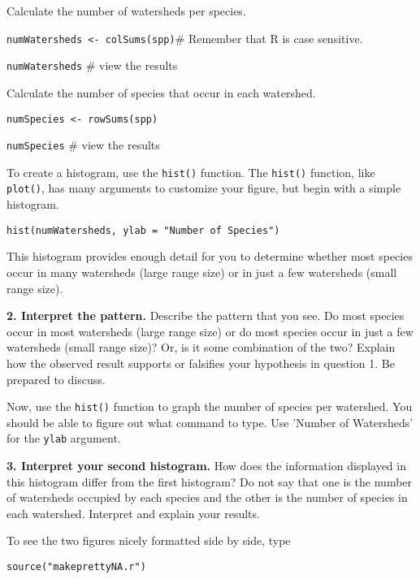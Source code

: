 \documentclass[11pt]{article}
\begin{document}
Calculate the number of watersheds per species.

\texttt{numWatersheds \textless{}- colSums(spp)}\qquad \# Remember that R is case
sensitive.

\texttt{numWatersheds} \qquad \# view the results

Calculate the number of species that occur in each watershed.

\texttt{numSpecies \textless{}- rowSums(spp)}

\texttt{numSpecies} \qquad \# view the results

To create a histogram, use the \texttt{hist()} function. The
\texttt{hist()} function, like \texttt{plot()}, has many arguments to
customize your figure, but begin with a simple histogram.

\texttt{hist(numWatersheds, ylab = "Number of Species")}

This histogram provides enough detail for you to determine whether most
species occur in many watersheds (large range size) or in just a few
watersheds (small range size).

\textbf{2. Interpret the pattern.} Describe the pattern that you see. Do most
species occur in most watersheds (large range size) or do most species
occur in just a few watersheds (small range size)? Or, is it some
combination of the two? Explain how the observed result supports or
falsifies your hypothesis in question 1. Be prepared to discuss.

\vspace{6\baselineskip}

Now, use the \texttt{hist()} function to graph the number of species per
watershed. You should be able to figure out what command to type. Use 'Number 
of Watersheds' for the \texttt{ylab} argument.

\textbf{3. Interpret your second histogram.} How does the information displayed
in this histogram differ from the first histogram? Do not say that
one is the number of watersheds occupied by each species and the other
is the number of species in each watershed. Interpret and explain your results.

\vspace{6\baselineskip}

To see the two figures nicely formatted side by side, type


\texttt{source("makeprettyNA.r")}
\end{document}
